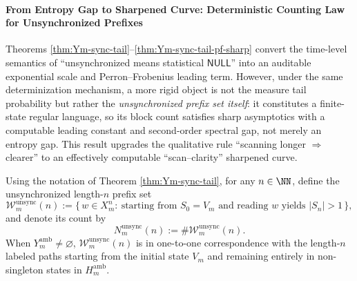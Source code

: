 \paragraph{From Entropy Gap to Sharpened Curve: Deterministic Counting Law for Unsynchronized Prefixes}
Theorems \ref{thm:Ym-sync-tail}--\ref{thm:Ym-sync-tail-pf-sharp} convert the time-level semantics of ``unsynchronized means statistical \(\mathsf{NULL}\)'' into an auditable exponential scale and Perron--Frobenius leading term.
However, under the same determinization mechanism, a more rigid object is not the measure tail probability but rather the \emph{unsynchronized prefix set itself}:
it constitutes a finite-state regular language, so its block count satisfies sharp asymptotics with a computable leading constant and second-order spectral gap, not merely an entropy gap.
This result upgrades the qualitative rule ``scanning longer \(\Rightarrow\) clearer'' to an effectively computable ``scan--clarity'' sharpened curve.

\begin{definition}\label{def:Ym-unsync-prefix-count}
Using the notation of Theorem \ref{thm:Ym-sync-tail},
for any \(n\in\NN\), define the unsynchronized length-\(n\) prefix set
\[
\mathcal{W}_{m}^{\mathrm{unsync}}(n)
:=\{\,w\in X_m^n:\ \text{starting from }S_0=V_m\text{ and reading }w\text{ yields }|S_n|>1\,\},
\]
and denote its count by
\[
N_m^{\mathrm{unsync}}(n):=\#\mathcal{W}_{m}^{\mathrm{unsync}}(n).
\]
When \(Y_m^{\mathrm{amb}}\neq\varnothing\), \(\mathcal{W}_{m}^{\mathrm{unsync}}(n)\) is in one-to-one correspondence with the length-\(n\) labeled paths starting from the initial state \(V_m\) and remaining entirely in non-singleton states in \(H_m^{\mathrm{amb}}\).
\end{definition}

